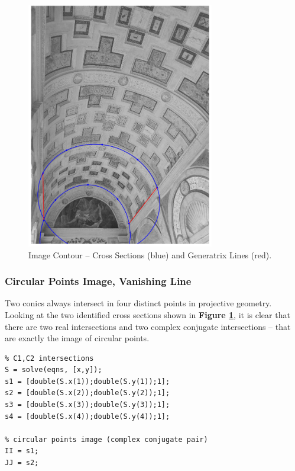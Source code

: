 \documentclass[12pt,a4paper]{article}
\begin{document}
\begin{figure}[H]
    \centering
    \includegraphics[width=0.73\textwidth]{Images/PalazzoTe_contour.png}
    \caption[Image Contour -- Cross Sections and Generatrix Lines.]{Image Contour -- Cross Sections (blue) and Generatrix Lines (red).}
    \label{fig:contour}
\end{figure}

\subsubsection{Circular Points Image, Vanishing Line}\label{sec:toVanishingLine}
Two conics always intersect in four distinct points in projective geometry. Looking at the two identified cross sections shown in \textbf{Figure \ref{fig:contour}}, it is clear that there are two real intersections and two complex conjugate intersections -- that are exactly the image of circular points.

\begin{verbatim}
% C1,C2 intersections
S = solve(eqns, [x,y]);
s1 = [double(S.x(1));double(S.y(1));1];
s2 = [double(S.x(2));double(S.y(2));1];
s3 = [double(S.x(3));double(S.y(3));1];
s4 = [double(S.x(4));double(S.y(4));1];

% circular points image (complex conjugate pair)
II = s1;
JJ = s2;
\end{verbatim}
\end{document}
